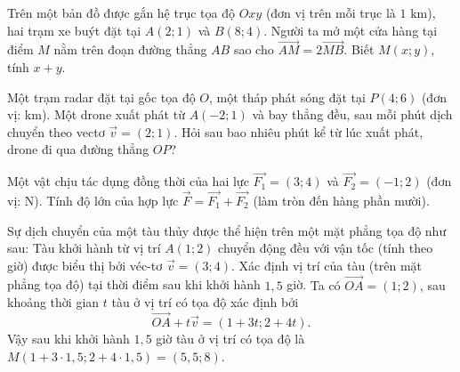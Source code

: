 \begin{bt}%
	Trên một bản đồ được gắn hệ trục tọa độ $Oxy$ (đơn vị trên mỗi trục là $1\text{ km}$), hai trạm xe buýt đặt tại $A(2;1)$ và $B(8;4)$. Người ta mở một cửa hàng tại điểm $M$ nằm trên đoạn đường thẳng $AB$ sao cho $\overrightarrow{AM}=2\overrightarrow{MB}$. Biết $M(x;y)$, tính $x+y$.
\end{bt}

\begin{bt}%
	Một trạm radar đặt tại gốc tọa độ $O$, một tháp phát sóng đặt tại $P(4;6)$ (đơn vị: km). Một drone xuất phát từ $A(-2;1)$ và bay thẳng đều, sau mỗi phút dịch chuyển theo vectơ $\overrightarrow{v}=(2;1)$. Hỏi sau bao nhiêu phút kể từ lúc xuất phát, drone đi qua đường thẳng $OP$?
\end{bt}

\begin{bt}%
	Một vật chịu tác dụng đồng thời của hai lực $\overrightarrow{F_1}=(3;4)$ và $\overrightarrow{F_2}=(-1;2)$ (đơn vị: N). Tính độ lớn của hợp lực $\overrightarrow{F}=\overrightarrow{F_1}+\overrightarrow{F_2}$ (làm tròn đến hàng phần mười).
\end{bt}

\begin{bt}%
	Sự dịch chuyển của một tàu thủy được thể hiện trên một mặt phẳng tọa độ như sau: Tàu khởi hành từ vị trí $A(1;2)$ chuyển động đều với vận tốc (tính theo giờ) được biểu thị bởi véc-tơ $\overrightarrow{v}=(3;4)$. Xác định vị trí của tàu (trên mặt phẳng tọa độ) tại thời điểm sau khi khởi hành $1{,}5$ giờ.
	\loigiai
	{
		Ta có $\overrightarrow{OA}=(1;2)$, sau khoảng thời gian $t$ tàu ở vị trí có tọa độ xác định bởi $$\overrightarrow{OA}+t\overrightarrow{v}=(1+3t;2+4t).$$
		Vậy sau khi khởi hành $1,5$ giờ tàu ở vị trí có tọa độ là $M(1+3\cdot 1,5;2+4\cdot 1,5)=(5,5;8)$.
	}
\end{bt}

